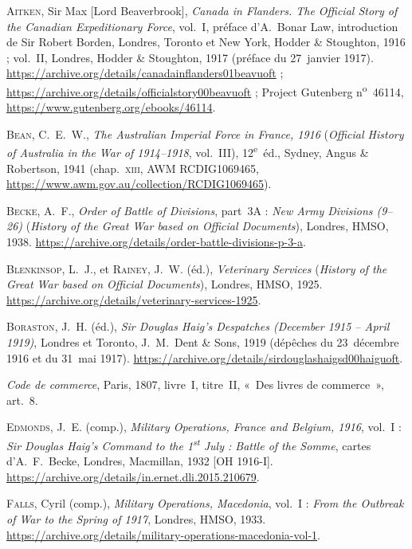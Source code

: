 \begin{biblist}
\item \textsc{Aitken}, Sir Max [Lord Beaverbrook], \textit{Canada in Flanders. The Official Story of the Canadian Expeditionary Force}, vol.~I, préface d'A.~Bonar Law, introduction de Sir Robert Borden, Londres, Toronto et New York, Hodder \& Stoughton, 1916 ; vol.~II, Londres, Hodder \& Stoughton, 1917 (préface du 27~janvier 1917). \url{https://archive.org/details/canadainflanders01beavuoft} ; \url{https://archive.org/details/officialstory00beavuoft} ; Project Gutenberg n\textsuperscript{o}~46114, \url{https://www.gutenberg.org/ebooks/46114}.
\item \textsc{Bean}, C.~E.~W., \textit{The Australian Imperial Force in France, 1916} (\textit{Official History of Australia in the War of 1914--1918}, vol.~III), 12\textsuperscript{e}~éd., Sydney, Angus \& Robertson, 1941 (chap.~\textsc{xiii}, AWM RCDIG1069465, \url{https://www.awm.gov.au/collection/RCDIG1069465}).
\item \textsc{Becke}, A.~F., \textit{Order of Battle of Divisions}, part~3A : \textit{New Army Divisions (9--26)} (\textit{History of the Great War based on Official Documents}), Londres, HMSO, 1938. \url{https://archive.org/details/order-battle-divisions-p-3-a}.
\item \textsc{Blenkinsop}, L.~J., et \textsc{Rainey}, J.~W. (éd.), \textit{Veterinary Services} (\textit{History of the Great War based on Official Documents}), Londres, HMSO, 1925. \url{https://archive.org/details/veterinary-services-1925}.
\item \textsc{Boraston}, J.~H. (éd.), \textit{Sir Douglas Haig's Despatches (December 1915 -- April 1919)}, Londres et Toronto, J.~M.~Dent \& Sons, 1919 (dépêches du 23~décembre 1916 et du 31~mai 1917). \url{https://archive.org/details/sirdouglashaigsd00haiguoft}.
\item \textit{Code de commerce}, Paris, 1807, livre~I, titre~II, «~Des livres de commerce~», art.~8.
\item \textsc{Edmonds}, J.~E. (comp.), \textit{Military Operations, France and Belgium, 1916}, vol.~I : \textit{Sir Douglas Haig's Command to the 1\textsuperscript{st} July : Battle of the Somme}, cartes d'A.~F.~Becke, Londres, Macmillan, 1932 [OH 1916-I]. \url{https://archive.org/details/in.ernet.dli.2015.210679}.
\item \textsc{Falls}, Cyril (comp.), \textit{Military Operations, Macedonia}, vol.~I : \textit{From the Outbreak of War to the Spring of 1917}, Londres, HMSO, 1933. \url{https://archive.org/details/military-operations-macedonia-vol-1}.

\end{biblist}
